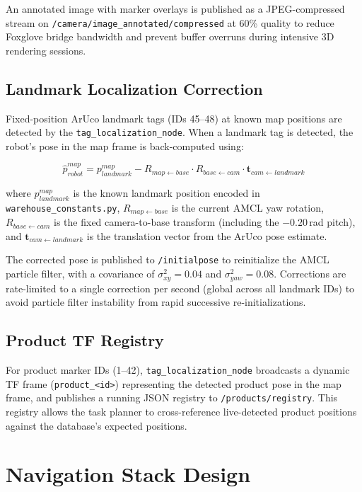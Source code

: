 \documentclass[12pt,a4paper]{report}
\begin{document}
An annotated image with marker overlays is published as a JPEG-compressed stream on \texttt{/camera/image\_annotated/compressed} at 60\% quality to reduce Foxglove bridge bandwidth and prevent buffer overruns during intensive 3D rendering sessions.

\subsection{Landmark Localization Correction}
\label{sec:landmark_correction}

Fixed-position ArUco landmark tags (IDs 45–48) at known map positions are detected by the \texttt{tag\_localization\_node}. When a landmark tag is detected, the robot's pose in the map frame is back-computed using:

\begin{equation}
\hat{p}_{robot}^{map} = p_{landmark}^{map} - R_{map \leftarrow base} \cdot R_{base \leftarrow cam} \cdot \mathbf{t}_{cam \leftarrow landmark}
\label{eq:landmark}
\end{equation}

where $p_{landmark}^{map}$ is the known landmark position encoded in \texttt{warehouse\_constants.py}, $R_{map \leftarrow base}$ is the current AMCL yaw rotation, $R_{base \leftarrow cam}$ is the fixed camera-to-base transform (including the $-0.20$\,rad pitch), and $\mathbf{t}_{cam \leftarrow landmark}$ is the translation vector from the ArUco pose estimate.

The corrected pose is published to \texttt{/initialpose} to reinitialize the AMCL particle filter, with a covariance of $\sigma^2_{xy} = 0.04$ and $\sigma^2_{yaw} = 0.08$. Corrections are rate-limited to a single correction per second (global across all landmark IDs) to avoid particle filter instability from rapid successive re-initializations.

\subsection{Product TF Registry}

For product marker IDs (1–42), \texttt{tag\_localization\_node} broadcasts a dynamic TF frame (\texttt{product\_<id>}) representing the detected product pose in the map frame, and publishes a running JSON registry to \texttt{/products/registry}. This registry allows the task planner to cross-reference live-detected product positions against the database's expected positions.

\section{Navigation Stack Design}
\end{document}

